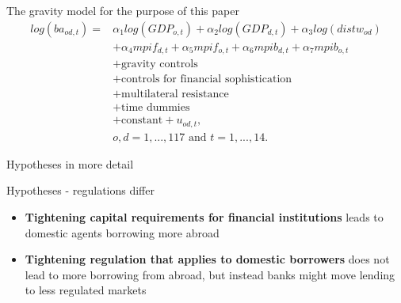 \documentclass{beamer}
\begin{document}
\begin{frame}{The gravity model for the purpose of this paper}
\begin{align}
log(ba_{od,t})= & \alpha_1 log(GDP_{o,t})+\alpha_2 log(GDP_{d,t}) +\alpha_3 log(distw_{od}) \nonumber\\
& + \alpha_4 mpif_{d,t} + \alpha_5 mpif_{o,t} + \alpha_6 mpib_{d,t} + \alpha_7 mpib_{o,t} \nonumber\\
& + \text{gravity controls} \nonumber\\
& + \text{controls for financial sophistication} \nonumber\\
& + \text{multilateral resistance} \nonumber\\
& + \text{time dummies} \nonumber\\
& + \text{constant}+ u_{od,t},  \\
& o, d=1, ..., 117 \text{ and } t=1, ..., 14. \nonumber
\label{my gravity}
\end{align}
\end{frame}


\begin{frame}{Hypotheses in more detail}
\begin{block}{Hypotheses - regulations differ} 
\begin{itemize}
\item \textbf{Tightening capital requirements for financial institutions} leads to domestic agents borrowing more abroad 
\item \textbf{Tightening regulation that applies to domestic borrowers} does not lead to more borrowing from abroad, but instead banks might move lending to less regulated markets
\end{itemize}
\end{block}
\end{frame}
\end{document}
